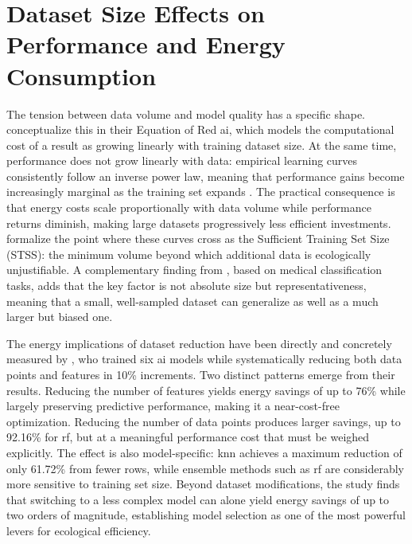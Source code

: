\section{Dataset Size Effects on Performance and Energy Consumption}
\label{sec:related_dataset_size}

The tension between data volume and model quality has a specific shape. \citeauthor{schwartzGreenAI2020} \cite{schwartzGreenAI2020} conceptualize this in their Equation of Red \gls{ai}, which models the computational cost of a result as growing linearly with training dataset size. At the same time, performance does not grow linearly with data: empirical learning curves consistently follow an inverse power law, meaning that performance gains become increasingly marginal as the training set expands \cite{koshuteRecommendingTrainingSet2021}. The practical consequence is that energy costs scale proportionally with data volume while performance returns diminish, making large datasets progressively less efficient investments. \citeauthor{koshuteRecommendingTrainingSet2021} \cite{koshuteRecommendingTrainingSet2021} formalize the point where these curves cross as the Sufficient Training Set Size (STSS): the minimum volume beyond which additional data is ecologically unjustifiable. A complementary finding from \citeauthor{althnianImpactDatasetSize2021} \cite{althnianImpactDatasetSize2021}, based on medical classification tasks, adds that the key factor is not absolute size but representativeness, meaning that a small, well-sampled dataset can generalize as well as a much larger but biased one.

The energy implications of dataset reduction have been directly and concretely measured by \citeauthor{verdecchiaDataCentricGreenAI2022a} \cite{verdecchiaDataCentricGreenAI2022a}, who trained six \gls{ai} models while systematically reducing both data points and features in 10\% increments. Two distinct patterns emerge from their results. Reducing the number of features yields energy savings of up to 76\% while largely preserving predictive performance, making it a near-cost-free optimization. Reducing the number of data points produces larger savings, up to 92.16\% for \gls{rf}, but at a meaningful performance cost that must be weighed explicitly. The effect is also model-specific: \gls{knn} achieves a maximum reduction of only 61.72\% from fewer rows, while ensemble methods such as \gls{rf} are considerably more sensitive to training set size. Beyond dataset modifications, the study finds that switching to a less complex model can alone yield energy savings of up to two orders of magnitude, establishing model selection as one of the most powerful levers for ecological efficiency.

